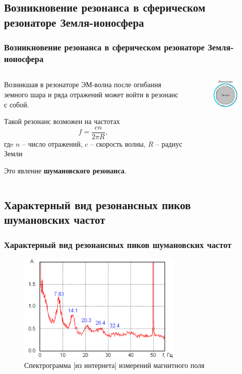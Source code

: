 \documentclass[10pt,pdf,hyperref={unicode}, dvipsnames]{beamer}
\newcommand\frametitless[1]{\subsection{#1}\frametitle{#1}}
\begin{document}
\begin{frame}[t]
	\frametitless{Возникновение резонанса в сферическом резонаторе Земля-ионосфера}
	\vfill
	\begin{columns}
		\begin{column}{0.49\textwidth}
			Возникшая в резонаторе ЭМ-волна после огибания земного шара и ряда отражений может войти в резонанс с собой. 
			\vspace{1em}

			Такой резонанс возможен на частотах
			\begin{equation*}
			 	f=\frac{cn}{2\pi R},
			\end{equation*} 
			гдe $n$ -- число отражений, $c$ -- скорость волны, $R$ -- радиус Земли
			\vspace{1em}

			Это явление \textbf{шумановского резонанса}.
	
		\end{column}
		\begin{column}{0.49\textwidth}
			\begin{figure}[h]
				\centering
				\includegraphics[scale=1.5]{images/sh}
			\end{figure}	
		\end{column}
	\end{columns}	
	\vfill
\end{frame}
\begin{frame}[t] 
	\frametitless{Характерный вид резонансных пиков шумановских частот}
	\begin{figure}[h]
		\centering
		\includegraphics[width=0.7\textwidth]{images/sp.png}
				\caption{Спектрограмма [из интернета] измерений магнитного поля}
	\end{figure}	
\end{frame}
\end{document}
